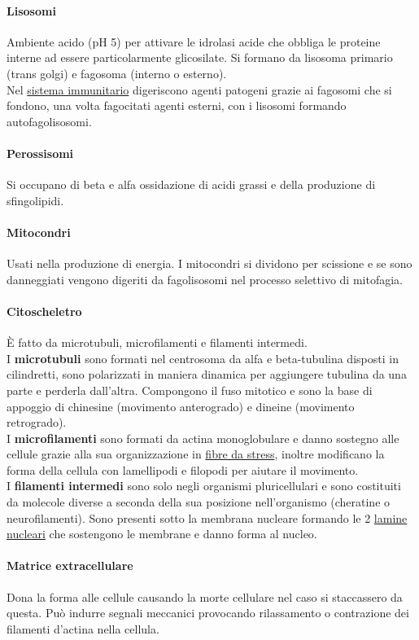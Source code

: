 \documentclass[10pt]{article}
\begin{document}
\paragraph*{Lisosomi}Ambiente acido (pH 5) per attivare le idrolasi acide che obbliga le proteine interne ad essere particolarmente glicosilate. Si formano da lisosoma primario (trans golgi) e fagosoma (interno o esterno).\\
Nel \underline{sistema immunitario} digeriscono agenti patogeni grazie ai fagosomi che si fondono, una volta fagocitati agenti esterni, con i lisosomi formando autofagolisosomi.
\paragraph*{Perossisomi}Si occupano di beta e alfa ossidazione di acidi grassi e della produzione di sfingolipidi. 
\paragraph*{Mitocondri}Usati nella produzione di energia. I mitocondri si dividono per scissione e se sono danneggiati vengono digeriti da fagolisosomi nel processo selettivo di mitofagia.
\paragraph*{Citoscheletro}È fatto da microtubuli, microfilamenti e filamenti intermedi.\\
I \textbf{microtubuli} sono formati nel centrosoma da alfa e beta-tubulina disposti in cilindretti, sono polarizzati in maniera dinamica per aggiungere tubulina da una parte e perderla dall'altra. Compongono il fuso mitotico e sono la base di appoggio di chinesine (movimento anterogrado) e dineine (movimento retrogrado).\\
I \textbf{microfilamenti} sono formati da actina monoglobulare e danno sostegno alle cellule grazie alla sua organizzazione in \underline{fibre da stress}, inoltre modificano la forma della cellula con lamellipodi e filopodi per aiutare il movimento.\\
I \textbf{filamenti intermedi} sono solo negli organismi pluricellulari e sono costituiti da molecole diverse a seconda della sua posizione nell'organismo (cheratine o neurofilamenti). Sono presenti sotto la membrana nucleare formando le 2 \underline{lamine nucleari} che sostengono le membrane e danno forma al nucleo. 
\paragraph*{Matrice extracellulare}
Dona la forma alle cellule causando la morte cellulare nel caso si staccassero da questa. Può indurre segnali meccanici provocando rilassamento o contrazione dei filamenti d'actina nella cellula.
\end{document}

